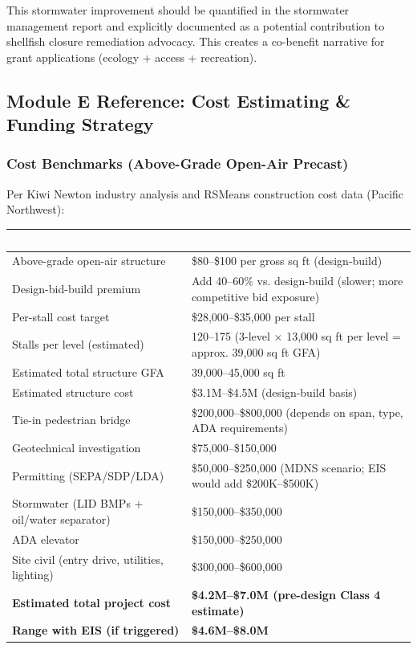 \documentclass[11pt,letterpaper]{article}
\newcommand{\tableheader}[1]{\textbf{\sffamily\textcolor{white}{#1}}}
\begin{document}
This stormwater improvement should be quantified in the stormwater management report and explicitly documented as a potential contribution to shellfish closure remediation advocacy. This creates a co-benefit narrative for grant applications (ecology + access + recreation).

\subsection{Module E Reference: Cost Estimating \& Funding Strategy}

\subsubsection{Cost Benchmarks (Above-Grade Open-Air Precast)}

Per Kiwi Newton industry analysis and RSMeans construction cost data (Pacific Northwest):

\begin{center}
\begin{tabularx}{\textwidth}{L{5cm}X}
\toprule
{}
\tableheader{Cost Element} & \tableheader{Benchmark} \\
\midrule
Above-grade open-air structure & \$80--\$100 per gross sq ft (design-build) \\
Design-bid-build premium & Add 40--60\% vs. design-build (slower; more competitive bid exposure) \\
Per-stall cost target & \$28,000--\$35,000 per stall \\
Stalls per level (estimated) & 120--175 (3-level $\times$ 13,000 sq ft per level = approx. 39,000 sq ft GFA) \\
Estimated total structure GFA & 39,000--45,000 sq ft \\
Estimated structure cost & \$3.1M--\$4.5M (design-build basis) \\
Tie-in pedestrian bridge & \$200,000--\$800,000 (depends on span, type, ADA requirements) \\
Geotechnical investigation & \$75,000--\$150,000 \\
Permitting (SEPA/SDP/LDA) & \$50,000--\$250,000 (MDNS scenario; EIS would add \$200K--\$500K) \\
Stormwater (LID BMPs + oil/water separator) & \$150,000--\$350,000 \\
ADA elevator & \$150,000--\$250,000 \\
Site civil (entry drive, utilities, lighting) & \$300,000--\$600,000 \\
\midrule
\textbf{Estimated total project cost} & \textbf{\$4.2M--\$7.0M (pre-design Class 4 estimate)} \\
\textbf{Range with EIS (if triggered)} & \textbf{\$4.6M--\$8.0M} \\
\bottomrule
\end{tabularx}
\end{center}
\end{document}
